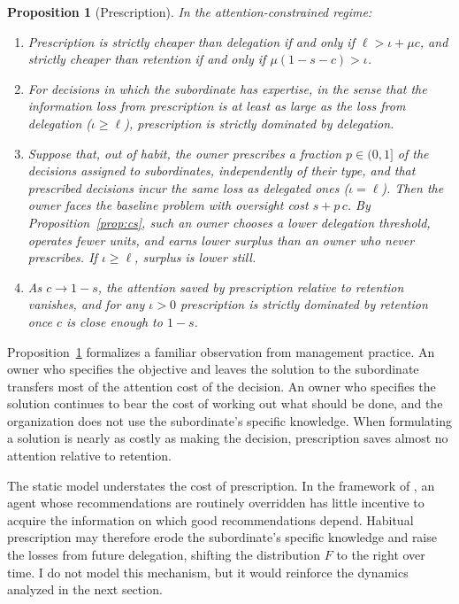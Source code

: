 \documentclass[11pt,a4paper]{article}
\theoremstyle{plain}
\newtheorem{proposition}{Proposition}
\begin{document}
\begin{proposition}[Prescription]\label{prop:prescription}
In the attention-constrained regime:
\begin{enumerate}
  \item Prescription is strictly cheaper than delegation if and only if $\ell > \iota + \mu c$, and strictly cheaper than retention if and only if $\mu(1 - s - c) > \iota$.
  \item For decisions in which the subordinate has expertise, in the sense that the information loss from prescription is at least as large as the loss from delegation ($\iota \ge \ell$), prescription is strictly dominated by delegation.
  \item Suppose that, out of habit, the owner prescribes a fraction $p \in (0, 1]$ of the decisions assigned to subordinates, independently of their type, and that prescribed decisions incur the same loss as delegated ones ($\iota = \ell$). Then the owner faces the baseline problem with oversight cost $s + p\,c$. By Proposition~\ref{prop:cs}, such an owner chooses a lower delegation threshold, operates fewer units, and earns lower surplus than an owner who never prescribes. If $\iota \ge \ell$, surplus is lower still.
  \item As $c \to 1 - s$, the attention saved by prescription relative to retention vanishes, and for any $\iota > 0$ prescription is strictly dominated by retention once $c$ is close enough to $1 - s$.
\end{enumerate}
\end{proposition}

Proposition~\ref{prop:prescription} formalizes a familiar observation from management practice. An owner who specifies the objective and leaves the solution to the subordinate transfers most of the attention cost of the decision. An owner who specifies the solution continues to bear the cost of working out what should be done, and the organization does not use the subordinate's specific knowledge. When formulating a solution is nearly as costly as making the decision, prescription saves almost no attention relative to retention.

The static model understates the cost of prescription. In the framework of \citet{aghion1997}, an agent whose recommendations are routinely overridden has little incentive to acquire the information on which good recommendations depend. Habitual prescription may therefore erode the subordinate's specific knowledge and raise the losses from future delegation, shifting the distribution $F$ to the right over time. I do not model this mechanism, but it would reinforce the dynamics analyzed in the next section.
\end{document}
